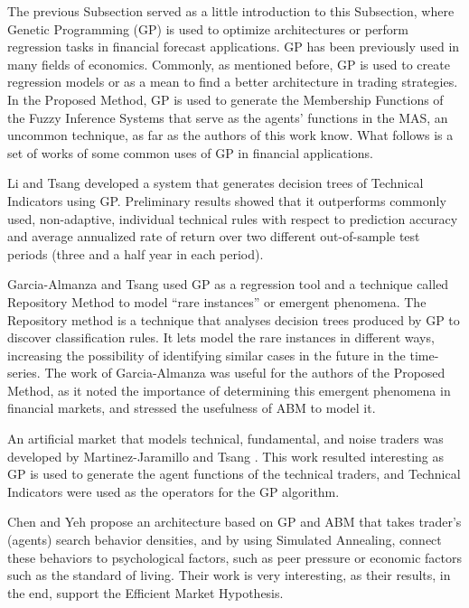\documentclass[12pt,journal,draftcls,onecolumn]{IEEEtran}
\begin{document}
The previous Subsection served as a little introduction to this Subsection, where Genetic Programming (GP) is used to optimize architectures or perform regression tasks in financial forecast applications. GP has been previously used in many fields of economics. Commonly, as mentioned before, GP is used to create regression models or as a mean to find a better architecture in trading strategies. In the Proposed Method, GP is used to generate the Membership Functions of the Fuzzy Inference Systems that serve as the agents' functions in the MAS, an uncommon technique, as far as the authors of this work know. What follows is a set of works of some common uses of GP in financial applications.

Li and Tsang \cite{Li1999} developed a system that generates decision trees of Technical Indicators using GP. Preliminary results showed that it outperforms commonly used, non-adaptive, individual technical rules with respect to prediction accuracy and average annualized rate of return over two different out-of-sample test periods (three and a half year in each period).

Garcia-Almanza and Tsang \cite{Garcia-Almanza2006} used GP as a regression tool and a technique called Repository Method to model ``rare instances'' or emergent phenomena. The Repository method is a technique that analyses decision trees produced by GP to discover classification rules. It lets model the rare instances in different ways, increasing the possibility of identifying similar cases in the future in the time-series. The work of Garcia-Almanza was useful for the authors of the Proposed Method, as it noted the importance of determining this emergent phenomena in financial markets, and stressed the usefulness of ABM to model it.

An artificial market that models technical, fundamental, and noise traders was developed by Martinez-Jaramillo and Tsang \cite{Martinez-Jaramillo2009}. This work resulted interesting as GP is used to generate the agent functions of the technical traders, and Technical Indicators were used as the operators for the GP algorithm.

Chen and Yeh \cite{Chen2001} propose an architecture based on GP and ABM that takes trader's (agents) search behavior densities, and by using Simulated Annealing, connect these behaviors to psychological factors, such as peer pressure or economic factors such as the standard of living. Their work is very interesting, as their results, in the end, support the Efficient Market Hypothesis.
\end{document}
